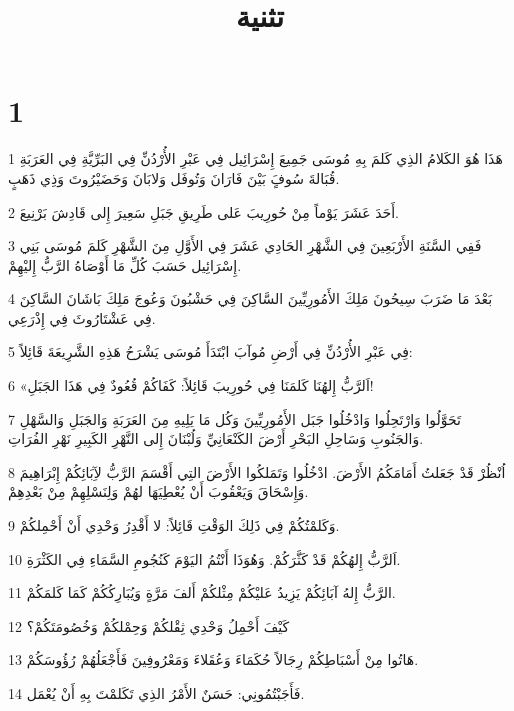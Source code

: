 

\title{تثنية}


\chapter{1}

\par 1 هَذَا هُوَ الكَلامُ الذِي كَلمَ بِهِ مُوسَى جَمِيعَ إِسْرَائِيل فِي عَبْرِ الأُرْدُنِّ فِي البَرِّيَّةِ فِي العَرَبَةِ قُبَالةَ سُوفٍَ بَيْنَ فَارَانَ وَتُوفَل وَلابَانَ وَحَضَيْرُوتَ وَذِي ذَهَبٍ.
\par 2 أَحَدَ عَشَرَ يَوْماً مِنْ حُورِيبَ عَلى طَرِيقِ جَبَلِ سَعِيرَ إِلى قَادِشَ بَرْنِيعَ.
\par 3 فَفِي السَّنَةِ الأَرْبَعِينَ فِي الشَّهْرِ الحَادِي عَشَرَ فِي الأَوَّلِ مِنَ الشَّهْرِ كَلمَ مُوسَى بَنِي إِسْرَائِيل حَسَبَ كُلِّ مَا أَوْصَاهُ الرَّبُّ إِليْهِمْ.
\par 4 بَعْدَ مَا ضَرَبَ سِيحُونَ مَلِكَ الأَمُورِيِّينَ السَّاكِنَ فِي حَشْبُونَ وَعُوجَ مَلِكَ بَاشَانَ السَّاكِنَ فِي عَشْتَارُوثَ فِي إِذْرَعِي.
\par 5 فِي عَبْرِ الأُرْدُنِّ فِي أَرْضِ مُوآبَ ابْتَدَأَ مُوسَى يَشْرَحُ هَذِهِ الشَّرِيعَةَ قَائِلاً:
\par 6 «اَلرَّبُّ إِلهُنَا كَلمَنَا فِي حُورِيبَ قَائِلاً: كَفَاكُمْ قُعُودٌ فِي هَذَا الجَبَلِ!
\par 7 تَحَوَّلُوا وَارْتَحِلُوا وَادْخُلُوا جَبَل الأَمُورِيِّينَ وَكُل مَا يَلِيهِ مِنَ العَرَبَةِ وَالجَبَلِ وَالسَّهْلِ وَالجَنُوبِ وَسَاحِلِ البَحْرِ أَرْضَ الكَنْعَانِيِّ وَلُبْنَانَ إِلى النَّهْرِ الكَبِيرِ نَهْرِ الفُرَاتِ.
\par 8 اُنْظُرْ قَدْ جَعَلتُ أَمَامَكُمُ الأَرْضَ. ادْخُلُوا وَتَمَلكُوا الأَرْضَ التِي أَقْسَمَ الرَّبُّ لآِبَائِكُمْ إِبْرَاهِيمَ وَإِسْحَاقَ وَيَعْقُوبَ أَنْ يُعْطِيَهَا لهُمْ وَلِنَسْلِهِمْ مِنْ بَعْدِهِمْ.
\par 9 وَكَلمْتُكُمْ فِي ذَلِكَ الوَقْتِ قَائِلاً: لا أَقْدِرُ وَحْدِي أَنْ أَحْمِلكُمْ.
\par 10 اَلرَّبُّ إِلهُكُمْ قَدْ كَثَّرَكُمْ. وَهُوَذَا أَنْتُمُ اليَوْمَ كَنُجُومِ السَّمَاءِ فِي الكَثْرَةِ.
\par 11 الرَّبُّ إِلهُ آبَائِكُمْ يَزِيدُ عَليْكُمْ مِثْلكُمْ أَلفَ مَرَّةٍ وَيُبَارِكُكُمْ كَمَا كَلمَكُمْ.
\par 12 كَيْفَ أَحْمِلُ وَحْدِي ثِقْلكُمْ وَحِمْلكُمْ وَخُصُومَتَكُمْ؟
\par 13 هَاتُوا مِنْ أَسْبَاطِكُمْ رِجَالاً حُكَمَاءَ وَعُقَلاءَ وَمَعْرُوفِينَ فَأَجْعَلُهُمْ رُؤُوسَكُمْ.
\par 14 فَأَجَبْتُمُونِي: حَسَنٌ الأَمْرُ الذِي تَكَلمْتَ بِهِ أَنْ يُعْمَل.
